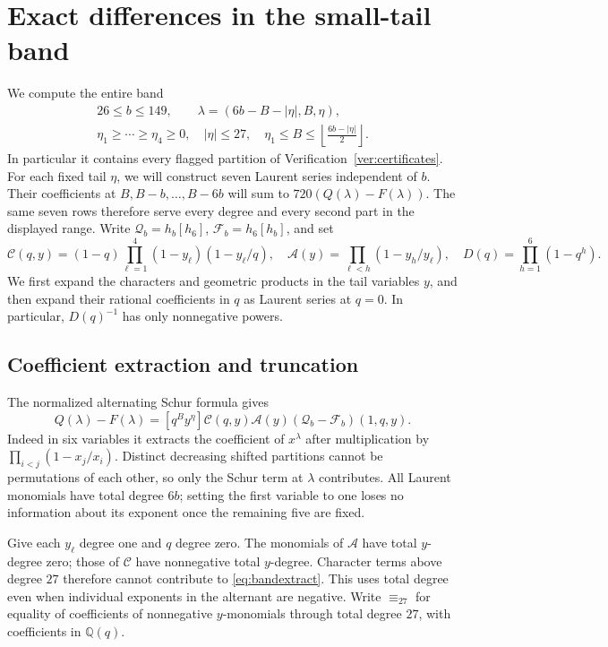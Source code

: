 \section{Exact differences in the small-tail band}\label{sec:band}

We compute the entire band
\[
\begin{gathered}
 26\le b\le149,\qquad
 \lambda=(6b-B-|\eta|,B,\eta),\\
 \eta_1\ge\cdots\ge\eta_4\ge0,\quad
 |\eta|\le27,\quad
 \eta_1\le B\le\left\lfloor\frac{6b-|\eta|}{2}\right\rfloor .
\end{gathered}
\]
In particular it contains every flagged partition of
Verification~\ref{ver:certificates}.
For each fixed tail \(\eta\), we will construct seven Laurent series
independent of \(b\). Their coefficients at
\(B,B-b,\ldots,B-6b\) will sum to \(720(Q(\lambda)-F(\lambda))\).
The same seven rows therefore serve every degree and every second part
in the displayed range.
Write \(\mathcal Q_b=h_b[h_6]\), \(\mathcal F_b=h_6[h_b]\), and set
\[
 \mathcal C(q,y)=(1-q)\prod_{\ell=1}^4(1-y_\ell)(1-y_\ell/q),\quad
 \mathcal A(y)=\prod_{\ell<h}(1-y_h/y_\ell),\quad
 D(q)=\prod_{h=1}^6(1-q^h).
\]
We first expand the characters and geometric products in the tail
variables \(y\), and then expand their rational coefficients in \(q\)
as Laurent series at \(q=0\). In particular, \(D(q)^{-1}\) has only
nonnegative powers.

\subsection{Coefficient extraction and truncation}
The normalized alternating Schur formula gives
\begin{equation}\label{eq:bandextract}
 Q(\lambda)-F(\lambda)
 =[q^By^\eta]\mathcal C(q,y)\mathcal A(y)
                       (\mathcal Q_b-\mathcal F_b)(1,q,y).
\end{equation}
Indeed in six variables it extracts the coefficient of \(x^\lambda\)
after multiplication by \(\prod_{i<j}(1-x_j/x_i)\). Distinct decreasing
shifted partitions cannot be permutations of each other, so only the
Schur term at \(\lambda\) contributes. All Laurent monomials have total
degree \(6b\); setting the first variable to one loses no information
about its exponent once the remaining five are fixed.

Give each \(y_\ell\) degree one and \(q\) degree zero.
The monomials of \(\mathcal A\) have total \(y\)-degree zero; those of
\(\mathcal C\) have nonnegative total \(y\)-degree. Character terms above
degree \(27\) therefore cannot contribute to \eqref{eq:bandextract}.
This uses total degree even when individual exponents in the alternant
are negative. Write \(\equiv_{27}\) for equality of coefficients of
nonnegative \(y\)-monomials through total degree \(27\), with coefficients
in \(\mathbb Q(q)\).

